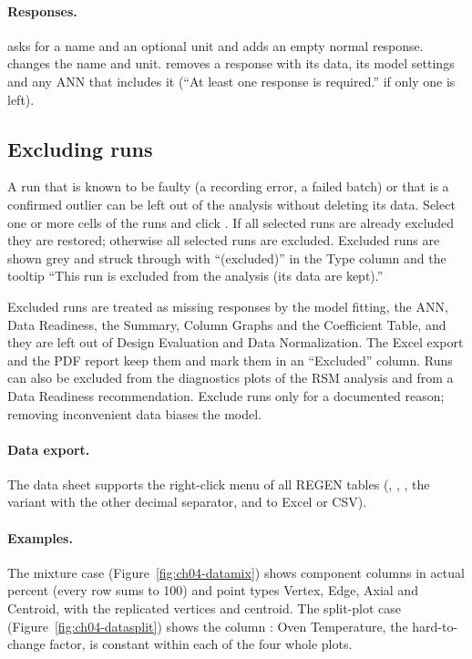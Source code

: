 \paragraph{Responses.}  asks for a name and an optional unit and adds an empty normal response.
 changes the name and unit.  removes a response with its data, its model
settings and any ANN that includes it (``At least one response is required.'' if only one is left).

\subsection{Excluding runs}
\label{sec:ch04-exclude}
A run that is known to be faulty (a recording error, a failed batch) or that is a confirmed outlier can be left out
of the analysis without deleting its data. Select one or more cells of the runs and click . If all selected runs are already excluded they are restored; otherwise all selected runs are excluded.
Excluded runs are shown grey and struck through with ``(excluded)'' in the Type column and the tooltip ``This run is
excluded from the analysis (its data are kept).''

Excluded runs are treated as missing responses by the model fitting, the ANN, Data Readiness, the Summary, Column
Graphs and the Coefficient Table, and they are left out of Design Evaluation and Data Normalization. The Excel export
and the PDF report keep them and mark them in an ``Excluded'' column. Runs can also be excluded from the diagnostics
plots of the RSM analysis and from a Data Readiness recommendation. Exclude runs only for a documented reason;
removing inconvenient data biases the model.

\paragraph{Data export.} The data sheet supports the right-click menu of all REGEN tables (,
, , the variant with the other decimal
separator, and  to Excel or CSV).

\paragraph{Examples.} The mixture case (Figure~\ref{fig:ch04-datamix}) shows component columns in actual percent
(every row sums to 100) and point types Vertex, Edge, Axial and Centroid, with the replicated vertices and centroid.
The split-plot case (Figure~\ref{fig:ch04-datasplit}) shows the column : Oven Temperature, the hard-to-change
factor, is constant within each of the four whole plots.

